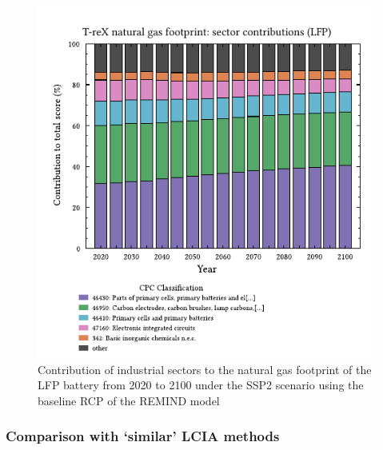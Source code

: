 \documentclass[a4paper,fleqn]{cas-dc}
\begin{document}
\begin{figure}
	\centering
	\includegraphics[width=0.9\columnwidth]{figures/T-reX-wastefootprint-sectorcontributions.pdf}
	\caption{Contribution of industrial sectors to the natural gas footprint of the LFP battery from 2020 to 2100 under the SSP2 scenario using the baseline RCP of the REMIND model}\label{fig:cpc_contribution}
\end{figure}

\subsubsection{Comparison with `similar' LCIA methods}\label{sec:results-case_study-methodcomparison}
\end{document}
